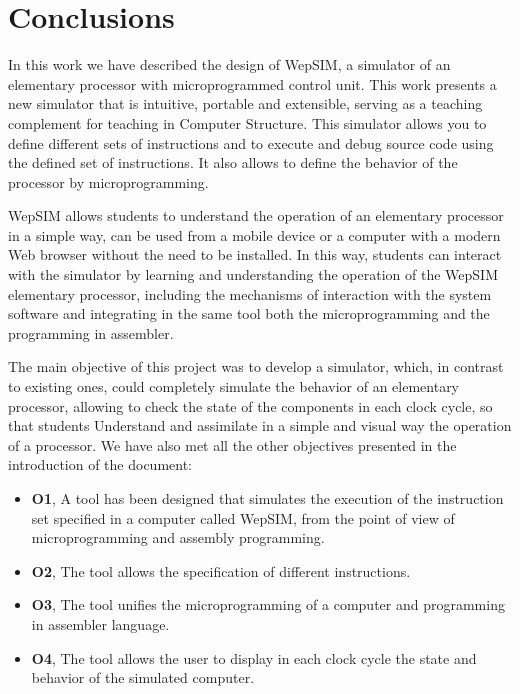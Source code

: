 \section*{Conclusions}

In this work we have described the design of WepSIM, a simulator of an elementary processor with microprogrammed control unit. This work presents a new simulator that is intuitive, portable and extensible, serving as a teaching complement for teaching in Computer Structure. This simulator allows you to define different sets of instructions and to execute and debug source code using the defined set of instructions. It also allows to define the behavior of the processor by microprogramming.

WepSIM allows students to understand the operation of an elementary processor in a simple way, can be used from a mobile device or a computer with a modern Web browser without the need to be installed. In this way, students can interact with the simulator by learning and understanding the operation of the WepSIM elementary processor, including the mechanisms of interaction with the system software and integrating in the same tool both the microprogramming and the programming in assembler.

The main objective of this project was to develop a simulator, which, in contrast to existing ones, could completely simulate the behavior of an elementary processor, allowing to check the state of the components in each clock cycle, so that students Understand and assimilate in a simple and visual way the operation of a processor. We have also met all the other objectives presented in the introduction of the document:

\begin{itemize}

\item \textbf{O1}, A tool has been designed that simulates the execution of the instruction set specified in a computer called WepSIM, from the point of view of microprogramming and assembly programming.

\item \textbf{O2}, The tool allows the specification of different instructions.

\item \textbf{O3}, The tool unifies the microprogramming of a computer and programming in assembler language.

\item \textbf{O4}, The tool allows the user to display in each clock cycle the state and behavior of the simulated computer.

\end{itemize}

